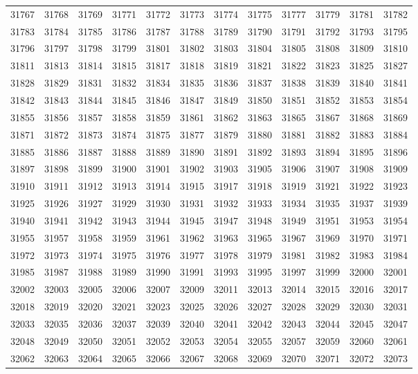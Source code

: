 \begin{center}
\begin{longtable}{llllllllllll}
31767 &31768 &31769 &31771 &31772 &31773 &31774 &31775 &31777 &31779 &31781 &31782 \\
31783 &31784 &31785 &31786 &31787 &31788 &31789 &31790 &31791 &31792 &31793 &31795 \\
31796 &31797 &31798 &31799 &31801 &31802 &31803 &31804 &31805 &31808 &31809 &31810 \\
31811 &31813 &31814 &31815 &31817 &31818 &31819 &31821 &31822 &31823 &31825 &31827 \\
31828 &31829 &31831 &31832 &31834 &31835 &31836 &31837 &31838 &31839 &31840 &31841 \\
31842 &31843 &31844 &31845 &31846 &31847 &31849 &31850 &31851 &31852 &31853 &31854 \\
31855 &31856 &31857 &31858 &31859 &31861 &31862 &31863 &31865 &31867 &31868 &31869 \\
31871 &31872 &31873 &31874 &31875 &31877 &31879 &31880 &31881 &31882 &31883 &31884 \\
31885 &31886 &31887 &31888 &31889 &31890 &31891 &31892 &31893 &31894 &31895 &31896 \\
31897 &31898 &31899 &31900 &31901 &31902 &31903 &31905 &31906 &31907 &31908 &31909 \\
31910 &31911 &31912 &31913 &31914 &31915 &31917 &31918 &31919 &31921 &31922 &31923 \\
31925 &31926 &31927 &31929 &31930 &31931 &31932 &31933 &31934 &31935 &31937 &31939 \\
31940 &31941 &31942 &31943 &31944 &31945 &31947 &31948 &31949 &31951 &31953 &31954 \\
31955 &31957 &31958 &31959 &31961 &31962 &31963 &31965 &31967 &31969 &31970 &31971 \\
31972 &31973 &31974 &31975 &31976 &31977 &31978 &31979 &31981 &31982 &31983 &31984 \\
31985 &31987 &31988 &31989 &31990 &31991 &31993 &31995 &31997 &31999 &32000 &32001 \\
32002 &32003 &32005 &32006 &32007 &32009 &32011 &32013 &32014 &32015 &32016 &32017 \\
32018 &32019 &32020 &32021 &32023 &32025 &32026 &32027 &32028 &32029 &32030 &32031 \\
32033 &32035 &32036 &32037 &32039 &32040 &32041 &32042 &32043 &32044 &32045 &32047 \\
32048 &32049 &32050 &32051 &32052 &32053 &32054 &32055 &32057 &32059 &32060 &32061 \\
32062 &32063 &32064 &32065 &32066 &32067 &32068 &32069 &32070 &32071 &32072 &32073 \\

\end{longtable}
\end{center}
